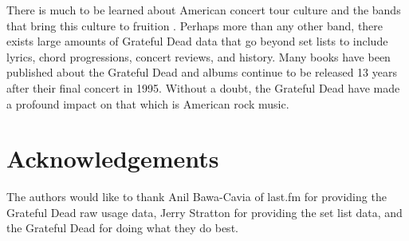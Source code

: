 \documentclass{svmult}
\begin{document}
There is much to be learned about American concert tour culture and the bands that bring this culture to fruition \cite{concert:black2007}. Perhaps more than any other band, there exists large amounts of Grateful Dead data that go beyond set lists to include lyrics, chord progressions, concert reviews, and history. Many books have been published about the Grateful Dead and albums continue to be released 13 years after their final concert in 1995.  Without a doubt, the Grateful Dead have made a profound impact on that which is American rock music.

\section*{Acknowledgements}

The authors would like to thank Anil Bawa-Cavia of last.fm for providing the Grateful Dead raw usage data, Jerry Stratton for providing the set list data, and the Grateful Dead for doing what they do best.
\end{document}
